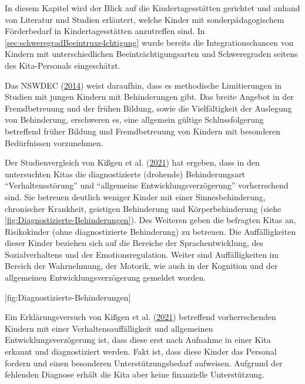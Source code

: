 \documentclass[
  ngerman,
  11pt,
  paper=a4,
  twoside,
  titlepage=true,
  openright,
  abstract=on,
  toc=listofnumbered,
  numbers=noenddot,
  chapterprefix=true,
  headings=optiontohead,
  svgnames,
  dvipsnames]{scrreprt}
\begin{document}
In diesem Kapitel wird der Blick auf die Kindertagesstätten gerichtet
und anhand von Literatur und Studien erläutert, welche Kinder mit
sonderpädagogischem Förderbedarf in Kindertagesstätten anzutreffen sind.
In \cref{sec:schweregradBeeintruxe4chtigung} wurde bereits die
Integrationschancen von Kindern mit unterschiedlichen
Beeinträchtigungsarten und Schweregraden seitens des Kita-Personals
eingeschätzt.

Das NSWDEC (\protect\hyperlink{ref-centreforeducation2014}{2014}) weist
daraufhin, dass es methodische Limitierungen in Studien mit jungen
Kindern mit Behinderungen gibt. Das breite Angebot in der Fremdbetreuung
und der frühen Bildung, sowie die Vielfältigkeit der Auslegung von
Behinderung, erschweren es, eine allgemein gültige Schlussfolgerung
betreffend früher Bildung und Fremdbetreuung von Kindern mit besonderen
Bedürfnissen vorzunehmen.

Der Studienvergleich von Kißgen et al.
(\protect\hyperlink{ref-studienvergleichbayernrheinland}{2021}) hat
ergeben, dass in den untersuchten Kitas die diagnostizierte (drohende)
Behinderungsart “Verhaltensstörung” und “allgemeine
Entwicklungsverzögerung” vorherrschend sind. Sie betreuen deutlich
weniger Kinder mit einer Sinnesbehinderung, chronischer Krankheit,
geistigen Behinderung und Körperbehinderung (siehe
\cref{fig:Diagnostizierte-Behinderungen}). Des Weiteren geben die
befragten Kitas an, Risikokinder (ohne diagnostizierte Behinderung) zu
betreuen. Die Auffälligkeiten dieser Kinder beziehen sich auf die
Bereiche der Sprachentwicklung, des Sozialverhaltens und der
Emotionsregulation. Weiter sind Auffälligkeiten im Bereich der
Wahrnehmung, der Motorik, wie auch in der Kognition und der allgemeinen
Entwicklungsverzögerung gemeldet worden.

[fig:Diagnostizierte-Behinderungen]

Ein Erklärungsversuch von Kißgen et al.
(\protect\hyperlink{ref-studienvergleichbayernrheinland}{2021})
betreffend vorherrschenden Kindern mit einer Verhaltensauffälligkeit und
allgemeinen Entwicklungsverzögerung ist, dass diese erst nach Aufnahme
in einer Kita erkannt und diagnostiziert werden. Fakt ist, dass diese
Kinder das Personal fordern und einen besonderen Unterstützungsbedarf
aufweisen. Aufgrund der fehlenden Diagnose erhält die Kita aber keine
finanzielle Unterstützung.
\end{document}
